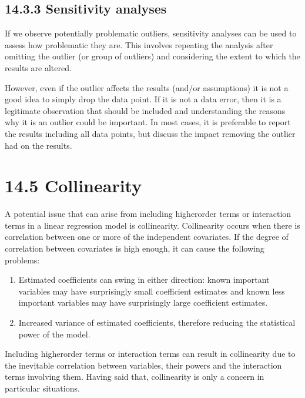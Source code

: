 \documentclass[letterpaper,10pt,english]{jupyterBook}
\begin{document}
\subsection{14.3.3 Sensitivity analyses}
\label{\detokenize{14.e. Linear Regression III:sensitivity-analyses}}
\sphinxAtStartPar
If we observe potentially problematic outliers, sensitivity analyses can be used to assess how problematic they are. This involves repeating the analysis after omitting the outlier (or group of outliers) and considering the extent to which the results are altered.

\sphinxAtStartPar
However, even if the outlier affects the results (and/or assumptions) it is not a good idea to simply drop the data point. If it is not a data error, then it is a legitimate observation that should be included and understanding the reasons why it is an outlier could be important. In most cases, it is preferable to report the results including all data points, but discuss the impact removing the outlier had on the results.


\section{14.5 Collinearity}
\label{\detokenize{14.f. Linear Regression III:collinearity}}\label{\detokenize{14.f. Linear Regression III::doc}}
\sphinxAtStartPar
A potential issue that can arise from including higher\sphinxhyphen{}order terms or interaction terms in a linear regression model is collinearity. Collinearity occurs when there is correlation between one or more of the independent covariates. If the degree of correlation between covariates is high enough, it can cause the following problems:
\begin{enumerate}
%
\item {} 
\sphinxAtStartPar
Estimated coefficients can swing in either direction: known important variables may have surprisingly small coefficient estimates and known less important variables may have surprisingly large coefficient estimates.

\item {} 
\sphinxAtStartPar
Increased variance of estimated coefficients, therefore reducing the statistical power of the model.

\end{enumerate}

\sphinxAtStartPar
Including higher\sphinxhyphen{}order terms or interaction terms can result in collinearity due to the inevitable correlation between variables, their powers and the interaction terms involving them. Having said that, collinearity is only a concern in particular situations.
\end{document}
